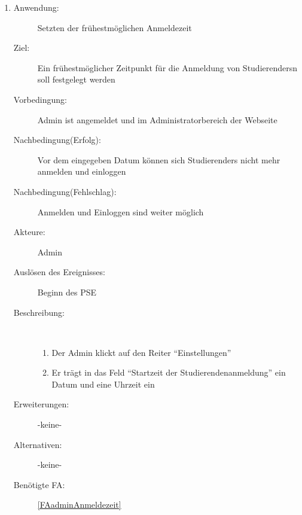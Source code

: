 \documentclass[parskip=full]{scrartcl}
\newcommand{\swtLabel}[1]{\textbf{/#1\arabic*0/}}
\begin{document}
\begin{enumerate} [label=\swtLabel{A}]
	\item \label{UCadminAnmeldezeit}
	\begin{description}
		\item[Anwendung:] Setzten der frühestmöglichen Anmeldezeit
		\item[Ziel:] Ein frühestmöglicher Zeitpunkt für die Anmeldung von \glspl{Studierender}n soll festgelegt werden
		\item[Vorbedingung:] \gls{Admin} ist angemeldet und im Administratorbereich der Webseite
		\item[Nachbedingung(Erfolg):] Vor dem eingegeben Datum können sich
		\glspl{Studierender} nicht mehr anmelden und einloggen
		\item[Nachbedingung(Fehlschlag):] Anmelden und Einloggen sind weiter möglich
		\item[Akteure:] \gls{Admin}
		\item[Auslösen des Ereignisses:] Beginn des \gls{PSE}
		\item[Beschreibung:]~
		\begin{enumerate}[label=\arabic*.]
			\item Der \gls{Admin} klickt auf den Reiter \enquote{Einstellungen}
			\item Er trägt in das Feld \enquote{Startzeit der Studierendenanmeldung} ein Datum und eine Uhrzeit ein
		\end{enumerate}
		\item[Erweiterungen:] -keine-
		\item[Alternativen:] -keine-
		\item[Benötigte FA:] \ref{FAadminAnmeldezeit}
	\end{description}	
	

\end{enumerate}
\end{document}
